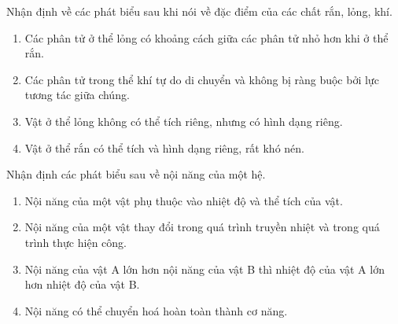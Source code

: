 \begin{ex}
Nhận định về các phát biểu sau khi nói về đặc điểm của các chất rắn, lỏng, khí.	
\begin{enumerate}[label=\alph*)]
	\item Các phân tử ở thể lỏng có khoảng cách giữa các phân tử nhỏ hơn khi ở thể rắn.
	\item Các phân tử trong thể khí tự do di chuyển và không bị ràng buộc bởi lực tương tác giữa chúng.
	\item Vật ở thể lỏng không có thể tích riêng, nhưng có hình dạng riêng.
	\item Vật ở thể rắn có thể tích và hình dạng riêng, rất khó nén.
\end{enumerate}
\end{ex}
\begin{ex}
Nhận định các phát biểu sau về nội năng của một hệ.
\begin{enumerate}[label=\alph*)]
	\item Nội năng của một vật phụ thuộc vào nhiệt độ và thể tích của vật.
	\item Nội năng của một vật thay đổi trong quá trình truyền nhiệt và trong quá trình thực hiện công.
	\item Nội năng của vật A lớn hơn nội năng của vật B thì nhiệt độ của vật A lớn hơn nhiệt độ của vật B.
	\item Nội năng có thể chuyển hoá hoàn toàn thành cơ năng.
\end{enumerate}	
\end{ex}
